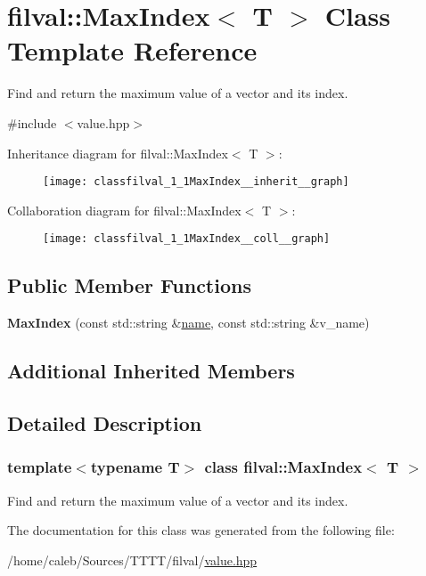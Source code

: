 \hypertarget{classfilval_1_1MaxIndex}{}\section{filval\+:\+:Max\+Index$<$ T $>$ Class Template Reference}
\label{classfilval_1_1MaxIndex}


Find and return the maximum value of a vector and its index.  




{\ttfamily \#include $<$value.\+hpp$>$}



Inheritance diagram for filval\+:\+:Max\+Index$<$ T $>$\+:
\nopagebreak
\begin{figure}[H]
\begin{center}
\leavevmode
\texttt{[image: classfilval\_1\_1MaxIndex\_\_inherit\_\_graph]}
\end{center}
\end{figure}


Collaboration diagram for filval\+:\+:Max\+Index$<$ T $>$\+:
\nopagebreak
\begin{figure}[H]
\begin{center}
\leavevmode
\texttt{[image: classfilval\_1\_1MaxIndex\_\_coll\_\_graph]}
\end{center}
\end{figure}
\subsection*{Public Member Functions}
\begin{DoxyCompactItemize}
\item 
\hypertarget{classfilval_1_1MaxIndex_aacf0ba84ef263c594c6e66b8208fffdf}{}\label{classfilval_1_1MaxIndex_aacf0ba84ef263c594c6e66b8208fffdf} 
{\bfseries Max\+Index} (const std\+::string \&\hyperlink{classfilval_1_1GenValue_a007e38c03ee041c2a657afa3d6e91ab1}{name}, const std\+::string \&v\+\_\+name)
\end{DoxyCompactItemize}
\subsection*{Additional Inherited Members}


\subsection{Detailed Description}
\subsubsection*{template$<$typename T$>$\newline
class filval\+::\+Max\+Index$<$ T $>$}

Find and return the maximum value of a vector and its index. 

The documentation for this class was generated from the following file\+:\begin{DoxyCompactItemize}
\item 
/home/caleb/\+Sources/\+T\+T\+T\+T/filval/\hyperlink{value_8hpp}{value.\+hpp}\end{DoxyCompactItemize}
